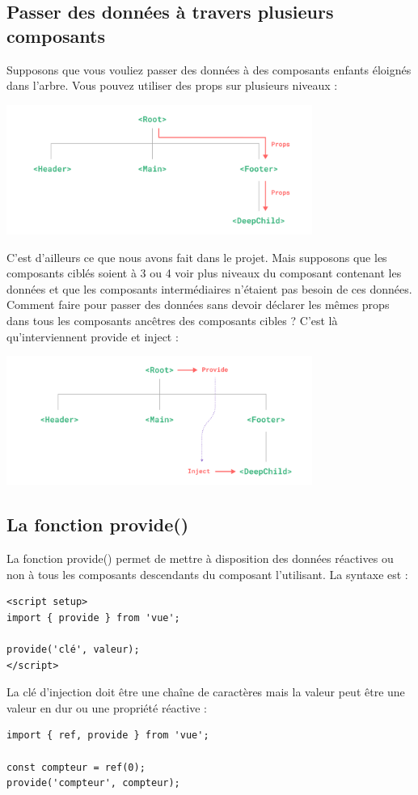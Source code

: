 \documentclass{article}
\begin{document}
\subsection{Passer des données à travers plusieurs composants}
Supposons que vous vouliez passer des données à des composants enfants éloignés dans l'arbre. Vous pouvez utiliser des {\color{monOrange}props} sur plusieurs niveaux :
\begin{center}
\includegraphics[width=10cm]{images/image11.png}
\end{center}

C'est d'ailleurs ce que nous avons fait dans le projet. Mais supposons que les composants ciblés soient à 3 ou 4 voir plus niveaux du composant contenant les données et que les composants intermédiaires n'étaient pas besoin de ces données. Comment faire pour passer des données sans devoir déclarer les mêmes {\color{monOrange}props} dans tous les composants ancêtres des composants cibles ? C'est là qu'interviennent {\color{monOrange}provide} et {\color{monOrange}inject} :
\begin{center}
\includegraphics[width=10cm]{images/image12.png}
\end{center}

\subsection{La fonction {\color{monOrange}provide()}}
La fonction {\color{monOrange}provide()} permet de mettre à disposition des données réactives ou non à tous les composants descendants du composant l'utilisant. La syntaxe est :
\begin{verbatim}
<script setup>
import { provide } from 'vue';

provide('clé', valeur);
</script>
\end{verbatim}
La clé d'injection doit être une chaîne de caractères mais la valeur peut être une valeur en dur ou une propriété réactive :
\begin{verbatim}
import { ref, provide } from 'vue';

const compteur = ref(0);
provide('compteur', compteur);
\end{verbatim}
\end{document}
